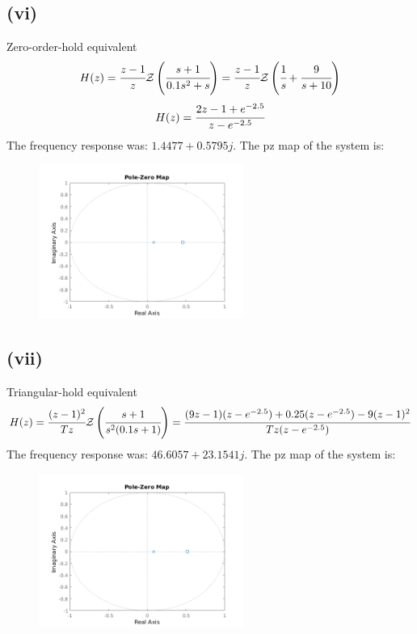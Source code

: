 \documentclass{article}
\begin{document}
\subsection*{(vi)}
Zero-order-hold equivalent\\
\[H(z)=\cfrac{z-1}{z}\mathcal{Z}\left (\cfrac{s+1}{0.1s^2+s}\right )=\cfrac{z-1}{z}\mathcal{Z}\left (\cfrac{1}{s}+\cfrac{9}{s+10}\right)\]
\[H(z)=\cfrac{2z-1+e^{-2.5}}{z-e^{-2.5}}\]
The frequency response was: $1.4477+0.5795j$. The pz map of the system is:
\begin{figure}[H]
    \centering
    \includegraphics[width=0.6\textwidth]{PR3_6.png}
\end{figure}

\subsection*{(vii)}
Triangular-hold equivalent\\
\[H(z)=\cfrac{(z-1)^2}{Tz}\mathcal{Z}\left(\cfrac{s+1}{s^2(0.1s+1)}\right)=\cfrac{(9z-1)(z-e^{-2.5})+0.25(z-e^{-2.5})-9(z-1)^2}{Tz(z-e^{-2.5})}\]
The frequency response was: $46.6057+23.1541j$. The pz map of the system is:
\begin{figure}[H]
    \centering
    \includegraphics[width=0.6\textwidth]{PR3_7.png}
\end{figure}
\end{document}
